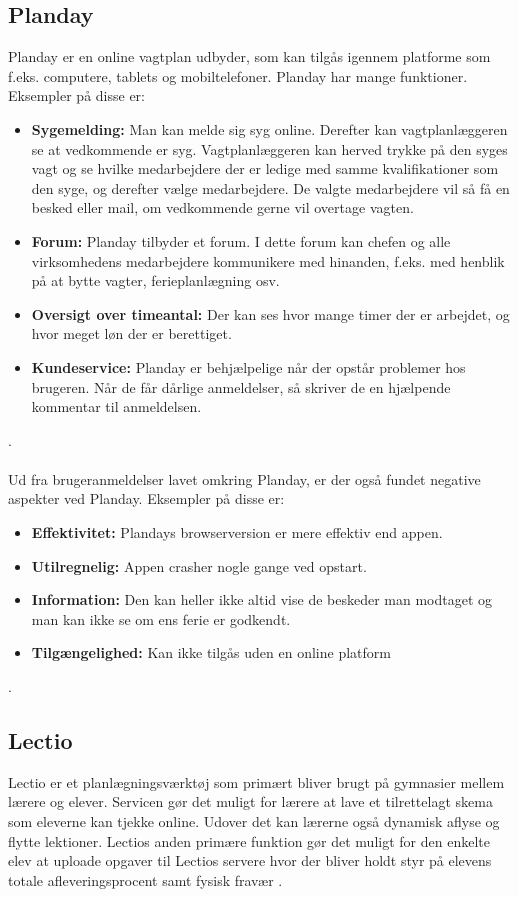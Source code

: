 \subsection{Planday}
Planday er en online vagtplan udbyder, som kan tilgås igennem platforme som f.eks. computere, tablets og mobiltelefoner. Planday har mange funktioner. Eksempler på disse er:
\begin{itemize}
\item {\textbf{Sygemelding:} Man kan melde sig syg online. Derefter kan vagtplanlæggeren se at vedkommende er syg. Vagtplanlæggeren kan herved trykke på den syges vagt og se hvilke medarbejdere der er ledige med samme kvalifikationer som den syge, og derefter vælge medarbejdere. De valgte medarbejdere vil så få en besked eller mail, om vedkommende gerne vil overtage vagten.}
\item {\textbf{Forum:} Planday tilbyder et forum. I dette forum kan chefen og alle virksomhedens medarbejdere kommunikere med hinanden, f.eks. med henblik på at bytte vagter, ferieplanlægning osv.}
\item {\textbf{Oversigt over timeantal:} Der kan ses hvor mange timer der er arbejdet, og hvor meget løn der er berettiget.}
\item {\textbf{Kundeservice:} Planday er behjælpelige når der opstår problemer hos brugeren. Når de får dårlige anmeldelser, så skriver de en hjælpende kommentar til anmeldelsen.} 
\end{itemize} 
\citep{DanskInternetHandel, Simonsen2014, Planday}.\\\\

Ud fra brugeranmeldelser lavet omkring Planday, er der også fundet negative aspekter ved Planday. Eksempler på disse er:
\begin{itemize}
\item {\textbf{Effektivitet:} Plandays browserversion er mere effektiv end appen.} 
\item {\textbf{Utilregnelig:} Appen crasher nogle gange ved opstart.}
\item {\textbf{Information:} Den kan heller ikke altid vise de beskeder man modtaget og man kan ikke se om ens ferie er godkendt.} 
\item {\textbf{Tilgængelighed:} Kan ikke tilgås uden en online platform}
\end{itemize}
\citep{Play}. \\

\subsection{Lectio}
Lectio er et planlægningsværktøj som primært bliver brugt på gymnasier mellem lærere og elever. Servicen gør det muligt for lærere at lave et tilrettelagt skema som eleverne kan tjekke online. Udover det kan lærerne også dynamisk aflyse og flytte lektioner. Lectios anden primære funktion gør det muligt for den enkelte elev at uploade opgaver til Lectios servere hvor der bliver holdt styr på elevens totale afleveringsprocent samt fysisk fravær \citep{Macom}.





